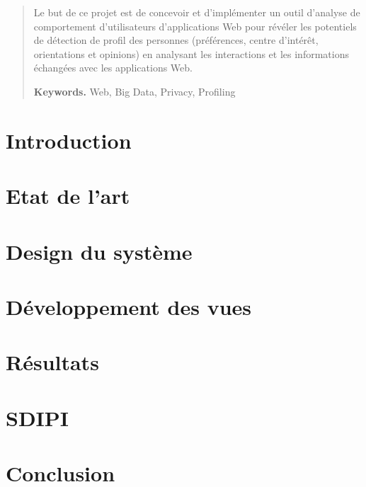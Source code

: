 






\def\myTitle{Web digital footprints and data privacy}
\def\myName{Kewin Dousse}
\def\myUni{HES-SO}
\def\myDepartment{TIC}
\def\mySupervisors{Nastaran Fatemi}
\def\myExpert{?}


\begin{abstract}

Le but de ce projet est de concevoir et d'implémenter un outil d'analyse de comportement d'utilisateurs d'applications Web pour révéler les potentiels de détection de profil des personnes (préférences, centre d'intérêt, orientations et opinions) en analysant les interactions et les informations échangées avec les applications Web.

\smallskip
\noindent \textbf{Keywords.} Web, Big Data, Privacy, Profiling

\end{abstract}
\setcounter{page}{3}
\hypersetup{pageanchor=true}

\tableofcontents
\listoffigures

\chapter{Introduction}

\chapter{Etat de l'art}

\chapter{Design du système}

\chapter{Développement des vues}

\chapter{Résultats}

\chapter{SDIPI}

\chapter{Conclusion}


